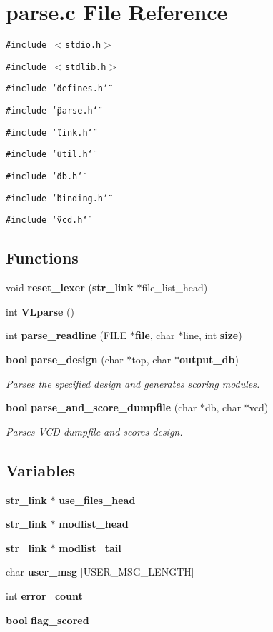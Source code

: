 \section{parse.c File Reference}
\label{parse_8c}
{\tt \#include $<$stdio.h$>$}\par
{\tt \#include $<$stdlib.h$>$}\par
{\tt \#include \char`\"{}defines.h\char`\"{}}\par
{\tt \#include \char`\"{}parse.h\char`\"{}}\par
{\tt \#include \char`\"{}link.h\char`\"{}}\par
{\tt \#include \char`\"{}util.h\char`\"{}}\par
{\tt \#include \char`\"{}db.h\char`\"{}}\par
{\tt \#include \char`\"{}binding.h\char`\"{}}\par
{\tt \#include \char`\"{}vcd.h\char`\"{}}\par
\subsection*{Functions}
\begin{CompactItemize}
\item 
void {\bf reset\_\-lexer} ({\bf str\_\-link} $\ast$file\_\-list\_\-head)
\item 
int {\bf VLparse} ()
\item 
int {\bf parse\_\-readline} (FILE $\ast${\bf file}, char $\ast$line, int {\bf size})
\item 
{\bf bool} {\bf parse\_\-design} (char $\ast$top, char $\ast${\bf output\_\-db})
\begin{CompactList}\small\item\em Parses the specified design and generates scoring modules. \item\end{CompactList}\item 
{\bf bool} {\bf parse\_\-and\_\-score\_\-dumpfile} (char $\ast$db, char $\ast$vcd)
\begin{CompactList}\small\item\em Parses VCD dumpfile and scores design. \item\end{CompactList}\end{CompactItemize}
\subsection*{Variables}
\begin{CompactItemize}
\item 
{\bf str\_\-link} $\ast$ {\bf use\_\-files\_\-head}
\item 
{\bf str\_\-link} $\ast$ {\bf modlist\_\-head}
\item 
{\bf str\_\-link} $\ast$ {\bf modlist\_\-tail}
\item 
char {\bf user\_\-msg} [USER\_\-MSG\_\-LENGTH]
\item 
int {\bf error\_\-count}
\item 
{\bf bool} {\bf flag\_\-scored}
\end{CompactItemize}


